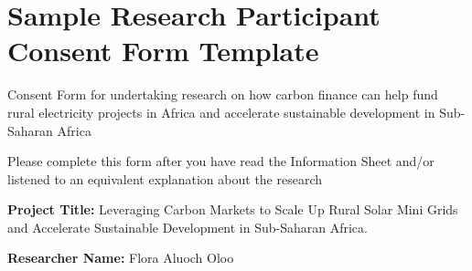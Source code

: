 \section{Sample Research Participant Consent Form Template}
\label{app:consent-form}
Consent Form for undertaking research on how carbon finance can help fund rural electricity projects in Africa and accelerate sustainable development in Sub-Saharan Africa

Please complete this form after you have read the Information Sheet and/or listened to an equivalent explanation about the research

\textbf{Project Title:} Leveraging Carbon Markets to Scale Up Rural Solar Mini Grids and Accelerate Sustainable Development in Sub-Saharan Africa.

\textbf{Researcher Name:} Flora Aluoch Oloo

